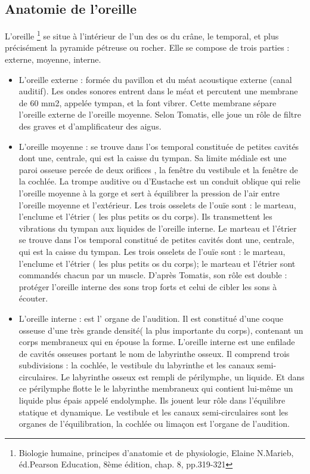 \subsection{Anatomie de l'oreille}
L'oreille \footnote{Biologie humaine, principes d'anatomie et de physiologie, Elaine N.Marieb,
	éd.Pearson Education, 8ème édition, chap. 8, pp.319-321}  se situe à l'intérieur de l'un des os du crâne, le temporal, et plus précisément la pyramide pétreuse ou rocher. Elle se compose de trois parties : externe, moyenne, interne.
\begin{itemize}
	\item  L'oreille externe : formée du pavillon et du méat acoustique externe
(canal auditif). Les ondes sonores entrent dans le méat et percutent
une membrane de 60 mm2, appelée tympan, et la font vibrer. Cette membrane
sépare l'oreille externe de l'oreille moyenne. 
Selon Tomatis, elle
joue un rôle de filtre des graves et d'amplificateur des aigus.
	\item 
	L'oreille moyenne :
se trouve dans l'os temporal constituée de petites cavités dont une, centrale, qui est la caisse du tympan. Sa limite
médiale est une paroi osseuse percée de deux orifices , la fenêtre
du vestibule et la fenêtre de la cochlée. La trompe auditive ou d'Eustache
est un conduit oblique qui relie l'oreille moyenne à la gorge et sert
à équilibrer la pression de l'air entre l'oreille moyenne et l'extérieur.
Les trois osselets de l'ouïe sont : le marteau, l'enclume et l'étrier
( les plus petits os du corps). Ils transmettent les vibrations du
tympan aux liquides de l'oreille interne. Le marteau et l'étrier se
trouve dans l'os temporal constitué de petites cavités dont une,
centrale, qui est la caisse du tympan. Les trois osselets de l'ouïe
sont : le marteau, l'enclume et l'étrier ( les plus petits os du corps);
le marteau et l'étrier sont commandés chacun par un muscle. D'après
Tomatis, son rôle est double : protéger l'oreille interne des sons
trop forts et celui de cibler les sons à écouter.
\item L'oreille interne
: est l' organe de l\textquoteright audition. Il
est constitué d'une coque osseuse d'une très grande densité( la plus
importante du corps), contenant un corps membraneux qui en épouse
la forme. L'oreille interne est une enfilade de cavités osseuses portant
le nom de labyrinthe osseux. Il comprend trois subdivisions : la cochlée,
le vestibule du labyrinthe et les canaux semi-circulaires. Le labyrinthe
osseux est rempli de périlymphe, un liquide. Et dans ce périlymphe
flotte le le labyrinthe membraneux qui contient lui-même un liquide
plus épais appelé endolymphe. Ils jouent leur rôle dans l'équilibre
statique et dynamique. Le vestibule et les canaux semi-circulaires
sont les organes de l\textquoteright équilibration, la cochlée ou
limaçon est l'organe de l'audition. 
\end{itemize}

